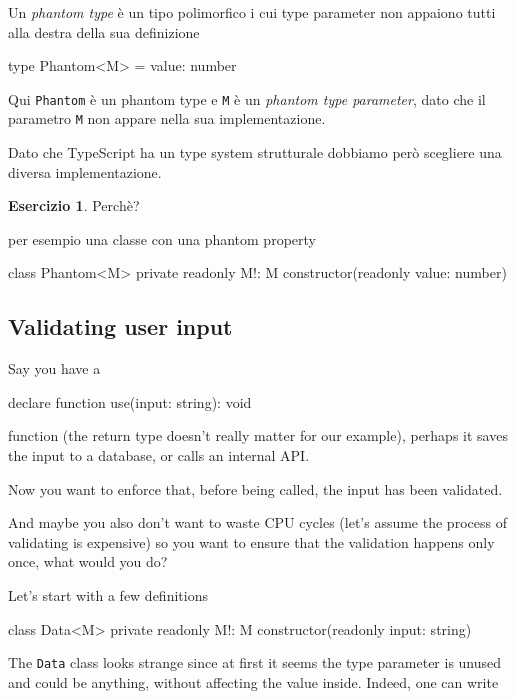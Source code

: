 \documentclass[12pt]{article}
\theoremstyle{definition}
\newtheorem{exercise}{Esercizio}[subsection]
\newenvironment{code}
  {\vspace{0.5cm} \VerbatimEnvironment\begin{typescriptcode}}
  {\end{typescriptcode} \vspace{0.2cm}}
\begin{document}
Un \emph{phantom type} è un tipo polimorfico i cui type parameter non appaiono tutti alla destra della sua definizione

\begin{code}
type Phantom<M> = { value: number }
\end{code}

Qui \texttt{Phantom} è un phantom type e \texttt{M} è un \emph{phantom type parameter},
dato che il parametro \texttt{M} non appare nella sua implementazione.

Dato che TypeScript ha un type system strutturale dobbiamo però scegliere una diversa implementazione.

\begin{exercise}
Perchè?
\end{exercise}

per esempio una classe con una phantom property

\begin{code}
class Phantom<M> {
  private readonly M!: M
  constructor(readonly value: number) {}
}
\end{code}

\subsection{Validating user input}

Say you have a

\begin{code}
declare function use(input: string): void
\end{code}

function (the return type doesn't really matter for our example),
perhaps it saves the input to a database, or calls an internal API.

Now you want to enforce that, before being called, the input has been validated.

And maybe you also don't want to waste CPU cycles (let's assume the process of validating is expensive)
so you want to ensure that the validation happens only once, what would you do?

Let's start with a few definitions

\begin{code}
class Data<M> {
  private readonly M!: M
  constructor(readonly input: string) {}
}
\end{code}

The \texttt{Data} class looks strange since at first it seems the type parameter is unused and could be anything,
without affecting the value inside. Indeed, one can write
\end{document}
